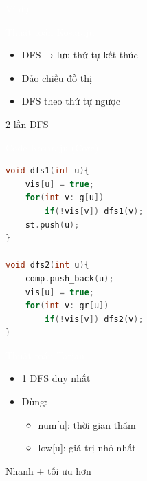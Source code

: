 \documentclass{beamer}
\newcommand{\hlblue}[1]{\textcolor{myblue}{#1}}
\newcommand{\hlgreen}[1]{\textcolor{mygreen}{#1}}
\newcommand{\hlpurple}[1]{\textcolor{mypurple}{#1}}
\newcommand{\hlwhite}[1]{\textcolor{white}{#1}}
\begin{document}

\begin{frame}{\hlwhite{Ví dụ}}
\centering
{}
\end{frame}


\begin{frame}{\hlwhite{Thuật toán Kosaraju}}
\begin{itemize}
\item DFS → lưu thứ tự kết thúc
\item Đảo chiều đồ thị
\item DFS theo thứ tự ngược
\end{itemize}

\begin{tcolorbox}
\centering
\hlpurple{2 lần DFS}
\end{tcolorbox}
\end{frame}

\begin{frame}[fragile]{\hlwhite{Code Kosaraju (Core)}}
\begin{lstlisting}[language=C++]
void dfs1(int u){
    vis[u] = true;
    for(int v: g[u])
        if(!vis[v]) dfs1(v);
    st.push(u);
}

void dfs2(int u){
    comp.push_back(u);
    vis[u] = true;
    for(int v: gr[u])
        if(!vis[v]) dfs2(v);
}
\end{lstlisting}
\end{frame}


\begin{frame}{\hlwhite{Thuật toán Tarjan}}
\begin{itemize}
\item 1 DFS duy nhất
\item Dùng:
\begin{itemize}
\item \hlblue{num[u]}: thời gian thăm
\item \hlblue{low[u]}: giá trị nhỏ nhất
\end{itemize}
\end{itemize}

\begin{tcolorbox}
\centering
\hlpurple{Nhanh + tối ưu hơn}
\end{tcolorbox}
\end{frame}
\end{document}
